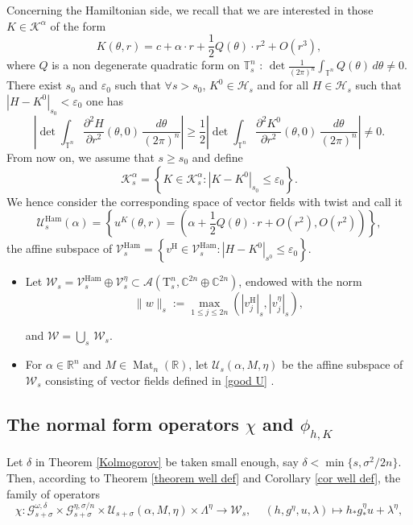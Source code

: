 \documentclass[oneside, 11pt]{amsbook}
\newcommand{\set}[1]{{\left\{#1\right\}}}
\newcommand{\abs}[1]{{\left|#1\right|}}
\newcommand{\normal}{\mathrm}
\newcommand{\G}{\mathcal{G}}
\newcommand{\U}{\mathcal{U}}
\newcommand{\T}{\mathbb{T}}
\newcommand{\R}{\mathbb{R}}
\newcommand{\C}{\mathbb{C}}
\newcommand{\teta}{\theta}
\newcommand{\eps}{\varepsilon}
\newcommand{\Mat}{\operatorname{Mat}}
\newcommand{\h}{\operatorname{H}}
\newcommand{\vh}{v^{\text{H}}} %
\newcommand{\Uh}{\mathcal{U}^{\operatorname{Ham}}}
\newcommand{\Vh}{\mathcal{V}^{\operatorname{Ham}}}
\newcommand{\push}[1]{#1_\ast}%
\def\U{{\mathcal U}}
\newcommand{\cA}{{\mathcal A}}
\newcommand{\cV}{{\mathcal V}}
\newcommand{\cW}{{\mathcal W}}
\newcommand{\0}{{(0)}}
\newcommand{\3}{{(3)}}
\numberwithin{equation}{section}
\numberwithin{defn}{section}
\numberwithin{prop}{section}
\numberwithin{cor}{section}
\numberwithin{lemma}{section}
\numberwithin{rmk}{section}
\numberwithin{corollary}{section}
\begin{document}
Concerning the Hamiltonian side, we recall that we are interested in those $K\in\mathcal{K}^\alpha$ of the form 
\begin{equation}
	K(\teta,r)= c + \alpha\cdot r + \frac{1}{2}Q(\teta)\cdot r^2 + O(r^3),
\end{equation} 
where $Q$ is a non degenerate quadratic form on $\T^n_s$ : $\det\frac{1}{(2\pi)^n}\int_{\T^n} Q(\teta)\,d\teta \neq 0$.\\
There exist $s_0$ and $\eps_0$ such that $\forall s>s_0$, $K^0\in\mathcal{H}_s$ and for all $H\in\mathcal{H}_{s}$ such that $\abs{H - K^0}_{s_0}<\eps_0$ one has \[\abs{\det\int_{\T^n}\frac{\partial^2 H}{\partial r^2}(\teta,0)\,\frac{d\teta}{(2\pi)^n}}\geq \frac{1}{2}\abs{\det\int_{\T^n}\frac{\partial^2 K^0}{\partial r^2}(\teta,0)\,\frac{d\teta}{(2\pi)^n}}\neq 0.\]
\noindent From now on, we assume that $s\geq s_0$ and define $$\mathcal{K}^\alpha_s = \set{K\in \mathcal{K}^\alpha_s: \abs{K - K^0}_{s_0}\leq \eps_0}.$$
We hence consider the corresponding space of vector fields with twist and call it 
\begin{equation}
	\Uh_s(\alpha) = \set{u^{K} (\teta,r)= (\alpha + \frac{1}{2}Q(\teta)\cdot r + O(r^2), O(r^2))}, 
\end{equation}
the affine subspace of $\Vh_s=\set{v^{\h}\in\Vh_s : \abs{H - K^0}_{s^0}\leq \eps_0}$.\\



\begin{itemize}[leftmargin=*]
	\item Let $\mathcal{W}_s= \Vh_s\oplus\cV^\eta_s\subset \cA({\normal{T}^n_s, \C^{2n}\oplus\C^{2n}})$, endowed with the norm \[\|{w}\|_s:= \max_{1\leq j\leq 2n}(|\vh_j|_s,|v^\eta_j|_s),\] 
		
		and $\mathcal{W}=\bigcup_s\,\mathcal{W}_s$.
	\item For $\alpha\in\R^n$ and $M\in\Mat_n(\R)$, let $\mathcal{U}_s(\alpha,M,\eta)$ be the affine subspace of $\cW_s$ consisting of vector fields defined in \eqref{good U} .
\end{itemize}

\subsection{The normal form operators $\chi$ and $\phi_{h,K}$}
 Let $\delta$ in Theorem \ref{Kolmogorov} be taken small enough, say $\delta < \min \{s, \sigma^2/2n\}$. Then, according to Theorem \ref{theorem well def} and Corollary \ref{cor well def}, the family of operators 
\begin{equation}
	\chi: \G_{s+\sigma}^{\omega,\delta}\times\G^{\eta,{\sigma/n}}_{s+\sigma}\times\U_{s+\sigma}(\alpha,M,\eta)\times\Lambda^\eta\to \cW_s,\,\quad (h,g^\eta,u,\lambda)\mapsto \push{h}\push{g}^\eta u + \lambda^\eta,
	\label{normal operator}
\end{equation} 
\end{document}
